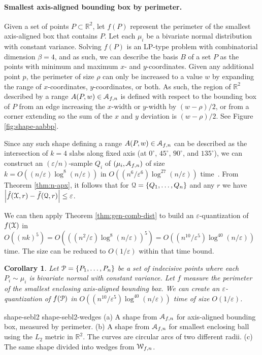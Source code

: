 \documentclass{journal}
\newcommand{\eps}{\varepsilon}
\newcommand{\Eu}[1]{\ensuremath{\EuScript{#1}}}
\newcommand{\R}{\ensuremath{\mathbb{R}}}
\newtheorem {corollary}[theorem]{Corollary}
\begin{document}
\paragraph{Smallest axis-aligned bounding box by perimeter.}
Given a set of points $P \subset \R^2$, let $f(P)$ represent the perimeter of the smallest axis-aligned box that contains $P$.  Let each $\mu_i$ be a bivariate normal distribution with constant variance.  Solving $f(P)$ is an LP-type problem with combinatorial dimension $\beta = 4$, and as such, we can describe the basis $B$ of a set $P$ as the points with minimum and maximum $x$- and $y$-coordinates.  Given any additional point $p$, the perimeter of size $\rho$ can only be increased to a value $w$ by expanding the range of $x$-coordinates, $y$-coordinates, or both.  As such, the region of $\R^2$ described by a range $A(P, w) \in \Eu A_{f,n}$ is defined with respect to the bounding box of $P$ from an edge increasing the $x$-width or $y$-width by $(w-\rho)/2$, or from a corner extending so the sum of the $x$ and $y$ deviation is $(w-\rho)/2$.  
See Figure \ref{fig:shape-aabbp}.

Since any such shape defining a range $A(P,w) \in \Eu A_{f,n}$ can be described as the intersection of $k=4$ slabs along fixed axis (at $0^\circ$, $45^\circ$, $90^\circ$, and $135^\circ$), we can construct an $(\eps/n)$-sample $Q_i$ of $(\mu_i, \Eu A_{f,n})$ of size $k = O((n/\eps) \log^{8} (n/\eps))$ in $O((n^6/\eps^6) \log^{27} (n/\eps))$ time~\cite{Phi08}.  From Theorem \ref{thm:n-apx}, it follows that for $\Eu Q = \{Q_1, \ldots, Q_n\}$ and any $r$ we have $\left| \hat f(\Eu X, r) - \tilde f(\Eu Q, r) \right| \leq \eps$.

We can then apply Theorem \ref{thm:gen-comb-dist} to build an $\eps$-quantization of $f(\Eu X)$ in $O((nk)^5) 
= O(((n^2/\eps) \log^8 (n/\eps))^5) 
= O((n^{10}/\eps^5) \log^{40} (n/\eps))$ time.  
The size can be reduced to $O(1/\eps)$ within that time bound. 

\begin{corollary}
Let $\Eu P = \{P_1, \ldots, P_n\}$ be a set of indecisive points where each $P_i \sim \mu_i$ is bivariate normal with constant variance.  Let $f$ measure the perimeter of the smallest enclosing axis-aligned bounding box.
We can create an $\eps$-quantization of $f(\Eu P)$ in $O((n^{10}/\eps^5) \log^{40} (n/\eps))$ time  of size $O(1/\eps)$.
\label{cor:n-apx-aabbp}
\end{corollary}


 {shape-sebl2} {shape-sebl2-wedges}
{
  (a) A shape from $\Eu{A}_{f,n}$ for axis-aligned bounding box, measured by perimeter.  
  (b) A shape from $\Eu{A}_{f,n}$ for smallest enclosing ball using the $L_2$ metric in $\R^2$. The curves are circular arcs of two different radii. 
  (c) The same shape divided into wedges from $\Eu{W}_{f,n}$.
}
\end{document}
